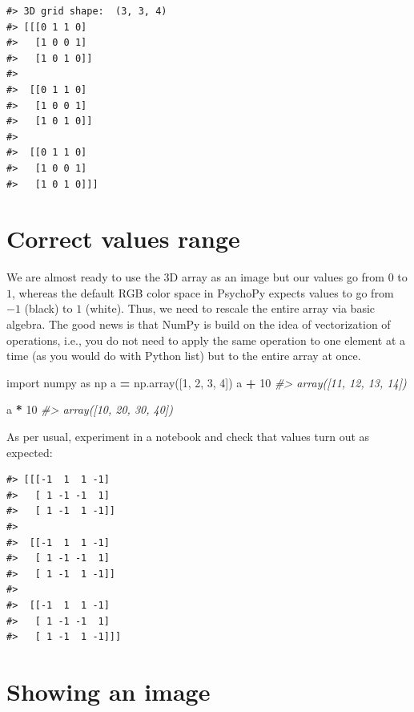 \documentclass[
]{book}
\newenvironment{Shaded}{\begin{snugshade}}{\end{snugshade}}
\newcommand{\CommentTok}[1]{\textcolor[rgb]{0.56,0.35,0.01}{\textit{#1}}}
\newcommand{\DecValTok}[1]{\textcolor[rgb]{0.00,0.00,0.81}{#1}}
\newcommand{\ImportTok}[1]{#1}
\newcommand{\NormalTok}[1]{#1}
\newcommand{\OperatorTok}[1]{\textcolor[rgb]{0.81,0.36,0.00}{\textbf{#1}}}
\begin{document}
\begin{verbatim}
#> 3D grid shape:  (3, 3, 4)
#> [[[0 1 1 0]
#>   [1 0 0 1]
#>   [1 0 1 0]]
#> 
#>  [[0 1 1 0]
#>   [1 0 0 1]
#>   [1 0 1 0]]
#> 
#>  [[0 1 1 0]
#>   [1 0 0 1]
#>   [1 0 1 0]]]
\end{verbatim}

\hypertarget{correct-values-range}{%
\section{Correct values range}\label{correct-values-range}}

We are almost ready to use the 3D array as an image but our values go from \(0\) to \(1\), whereas the default RGB color space in PsychoPy expects values to go from \(-1\) (black) to \(1\) (white). Thus, we need to rescale the entire array via basic algebra. The good news is that NumPy is build on the idea of vectorization of operations, i.e., you do not need to apply the same operation to one element at a time (as you would do with Python list) but to the entire array at once.

\begin{Shaded}
\begin{Highlighting}[]
\ImportTok{import}\NormalTok{ numpy }\ImportTok{as}\NormalTok{ np}
\NormalTok{a }\OperatorTok{=}\NormalTok{ np.array([}\DecValTok{1}\NormalTok{, }\DecValTok{2}\NormalTok{, }\DecValTok{3}\NormalTok{, }\DecValTok{4}\NormalTok{])}
\NormalTok{a }\OperatorTok{+} \DecValTok{10}
\CommentTok{\#\textgreater{} array([11, 12, 13, 14])}

\NormalTok{a }\OperatorTok{*} \DecValTok{10}
\CommentTok{\#\textgreater{} array([10, 20, 30, 40])}
\end{Highlighting}
\end{Shaded}

As per usual, experiment in a notebook and check that values turn out as expected:

\begin{verbatim}
#> [[[-1  1  1 -1]
#>   [ 1 -1 -1  1]
#>   [ 1 -1  1 -1]]
#> 
#>  [[-1  1  1 -1]
#>   [ 1 -1 -1  1]
#>   [ 1 -1  1 -1]]
#> 
#>  [[-1  1  1 -1]
#>   [ 1 -1 -1  1]
#>   [ 1 -1  1 -1]]]
\end{verbatim}

\hypertarget{showing-an-image}{%
\section{Showing an image}\label{showing-an-image}}
\end{document}
